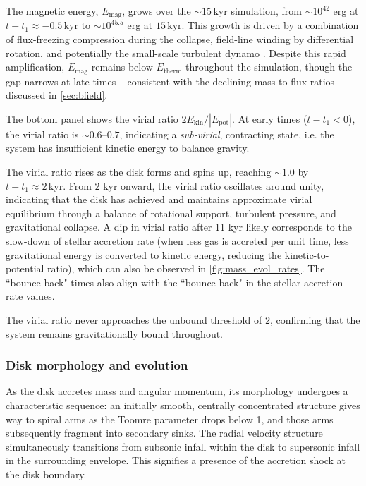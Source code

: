 \documentclass[twocolumn]{openjournal}
\newcommand{\kyr}{\,\mathrm{kyr}}
\newcommand{\tform}{t_1}
\begin{document}


The magnetic energy,
$E_\mathrm{mag}$, grows
over the $\sim 15\kyr$ simulation, from $\sim 10^{42}$ erg at
$t - \tform \approx -0.5\kyr$ to $\sim 10^{45.5}$ erg at $15\kyr$. This growth
is driven by a combination of flux-freezing compression during the collapse,
field-line winding
by differential rotation, and potentially the small-scale turbulent dynamo
\citep{sharda21}. Despite this rapid amplification, $E_\mathrm{mag}$ remains
below $E_\mathrm{therm}$ throughout the simulation, though the gap narrows at
late times -- consistent with the declining mass-to-flux ratios discussed in
\autoref{sec:bfield}.


The bottom panel shows the virial ratio $2 E_\mathrm{kin} / |E_\mathrm{pot}|$.
At early times ($t - \tform < 0$), the virial ratio is $\sim 0.6$--$0.7$,
indicating a \textit{sub-virial}, contracting state, i.e. the system has
insufficient kinetic energy to balance gravity.

The virial ratio rises as the disk forms and spins up, reaching $\sim 1.0$ by
$t - \tform \approx 2\kyr$. From $2$ kyr onward, the virial ratio oscillates
around unity, indicating that the disk has achieved and maintains approximate
virial equilibrium through a balance of rotational support, turbulent pressure,
and gravitational collapse. A dip in virial ratio after 11 kyr likely
corresponds to the slow-down of stellar accretion rate (when less gas
is accreted per unit time, less gravitational energy is converted to
kinetic energy, reducing the kinetic-to-potential ratio), which can also
be observed in \autoref{fig:mass_evol_rates}. The ``bounce-back" times also
align with the ``bounce-back" in the stellar accretion rate values.

The virial ratio never approaches the unbound threshold of $2$,
confirming that the system remains gravitationally bound throughout.


\subsubsection{Disk morphology and evolution}
\label{sec:morphology}

As the disk accretes mass and angular momentum, its morphology undergoes a characteristic sequence: an initially smooth, centrally concentrated structure gives way to spiral arms as the Toomre parameter drops below 1, and those arms subsequently fragment into secondary sinks.
The radial velocity structure simultaneously transitions from subsonic infall within the disk to supersonic infall in the surrounding envelope.
This signifies a presence of the accretion shock at the disk boundary.
\end{document}

